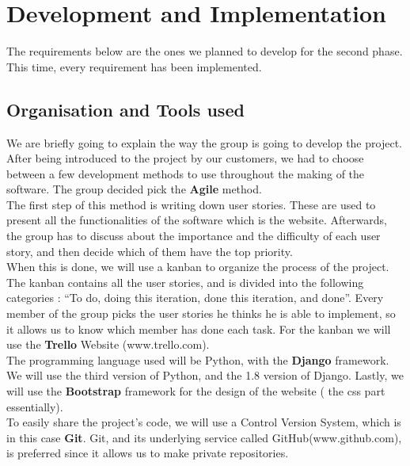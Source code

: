 \documentclass[a4paper, 12pt]{article}
\begin{document}
\newpage
\section{Development and Implementation}

The requirements below are the ones we planned to develop for the second phase. This time, every requirement has been implemented. \\

\subsection{Organisation and Tools used}

We are briefly going to explain the way the group is going to develop the project. After being introduced to the project by our customers, we had to choose between a few development methods to use throughout the making of the software. The group decided pick the \textbf{Agile} method. \\

The first step of this method is writing down user stories. These are used to present all the functionalities of the software which is the website. Afterwards, the group has to discuss about the importance and the difficulty of each user story, and then decide which of them have the top priority. \\

When this is done, we will use a kanban to organize the process of the project. The kanban contains all the user stories, and is divided into the following categories : “To do, doing this iteration, done this iteration, and done”. Every member of the group picks the user stories he thinks he is able to implement, so it allows us to know which member has done each task. For the kanban we will use the \textbf{Trello} Website (www.trello.com). \\

The programming language used will be Python, with the \textbf{Django} framework.\\

 We will use the third version of Python, and the 1.8 version of Django. Lastly, we will use the \textbf{Bootstrap} framework for the design of the website ( the css part essentially). \\

To easily share the project’s code, we will use a Control Version System, which is in this case \textbf{Git}. Git, and its underlying service called GitHub(www.github.com), is preferred since it allows us to make private repositories. 
\end{document}
